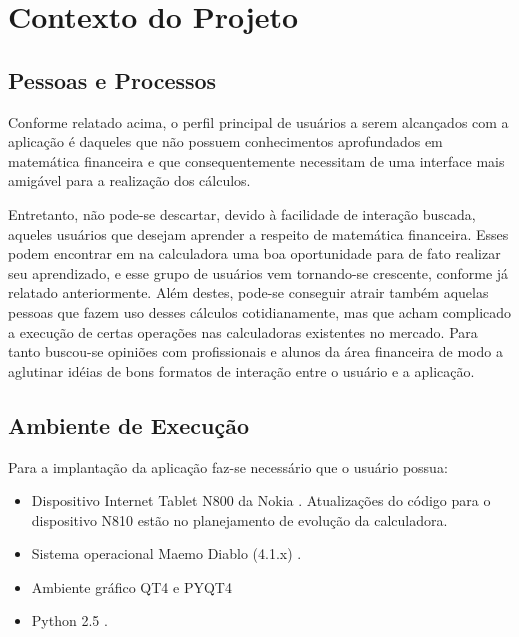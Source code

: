\section{Contexto do Projeto}

\subsection{Pessoas e Processos}

Conforme relatado acima, o perfil principal de usuários a serem alcançados com a aplicação é daqueles que não possuem conhecimentos aprofundados em matemática financeira e que consequentemente necessitam de uma interface mais amigável para a realização dos cálculos.

Entretanto, não pode-se descartar, devido à facilidade de interação buscada, aqueles usuários que desejam aprender a respeito de matemática financeira. Esses podem encontrar em na calculadora uma boa oportunidade para de fato realizar seu aprendizado, e esse grupo de usuários vem tornando-se crescente, conforme já relatado anteriormente. Além destes, pode-se conseguir atrair também aquelas pessoas que fazem uso desses cálculos cotidianamente, mas que acham complicado a execução de certas operações nas calculadoras existentes no mercado. Para tanto buscou-se opiniões com profissionais e alunos da área financeira de modo a aglutinar idéias de bons formatos de interação entre o usuário e a aplicação.


\subsection{Ambiente de Execução}


Para a implantação da aplicação faz-se necessário que o usuário possua:

\begin{itemize}
 \item Dispositivo Internet Tablet N800 da Nokia \cite{n800}. Atualizações do código para o dispositivo N810 estão no planejamento de evolução da calculadora.
 \item Sistema operacional Maemo Diablo (4.1.x) \cite{diablo}.
 \item Ambiente gráfico QT4 \cite{qt4} e PYQT4 \cite{pyqt4}
 \item Python 2.5 \cite{python}.
\end{itemize}


